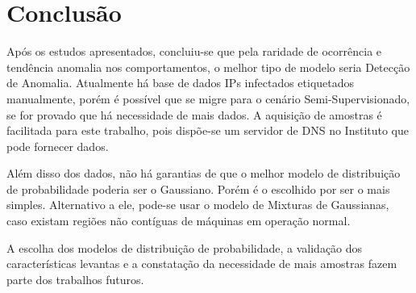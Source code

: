 \chapter{Conclusão}
Após os estudos apresentados, concluiu-se que pela raridade de ocorrência e tendência anomalia nos comportamentos, o melhor tipo de modelo seria Detecção de Anomalia. Atualmente há base de dados IPs infectados etiquetados manualmente, porém é possível que se migre para o cenário Semi-Supervisionado, se for provado que há necessidade de mais dados. A aquisição de amostras é facilitada para este trabalho, pois dispõe-se um servidor de DNS no Instituto que pode fornecer dados.

Além disso dos dados, não há garantias de que o melhor modelo de distribuição de probabilidade poderia ser o Gaussiano. Porém é o escolhido por ser o mais simples. Alternativo a ele, pode-se usar o modelo de Mixturas de Gaussianas, caso existam regiões não contíguas de máquinas em operação normal.

A escolha dos modelos de distribuição de probabilidade, a validação dos características levantas e a constatação da necessidade de mais amostras fazem parte dos trabalhos futuros.